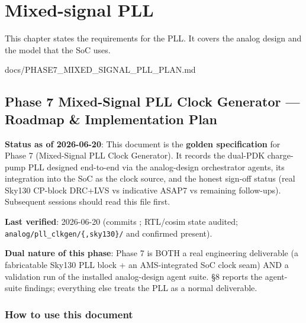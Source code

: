 \chapter{Mixed-signal PLL}\label{ds:ch:mixed-signal-pll}

This chapter states the requirements for the PLL. It covers the analog design and the model that the SoC uses.

\begin{relocated}{docs/PHASE7_MIXED_SIGNAL_PLL_PLAN.md}
\section{Phase 7 Mixed-Signal PLL Clock Generator --- Roadmap \&
Implementation Plan}\label{ds:ch:phase7-pll-plan}

\textbf{Status as of 2026-06-20}: This document is the \textbf{golden
specification} for Phase 7 (Mixed-Signal PLL Clock Generator). It
records the dual-PDK charge-pump PLL designed end-to-end via the
analog-design orchestrator agents, its integration into the SoC as the
clock source, and the honest sign-off status (real Sky130 CP-block
DRC+LVS vs indicative ASAP7 vs remaining follow-ups). Subsequent
sessions should read this file first.

\textbf{Last verified}: 2026-06-20 (commits ;
RTL/cosim state audited;
\texttt{analog/\allowbreak{}pll\_\allowbreak{}clkgen/\allowbreak{}\{,\allowbreak{}sky130\}/\allowbreak{}}
and  confirmed present).

\textbf{Dual nature of this phase}: Phase 7 is BOTH a real engineering
deliverable (a fabricatable Sky130 PLL block + an AMS-integrated SoC
clock seam) AND a validation run of the installed analog-design agent
suite. §8 reports the agent-suite findings; everything else treats the
PLL as a normal deliverable.

\subsection{How to use this document}\label{ds:ch:phase7-pll-plan:how-to-use-this-document}


\end{relocated}
